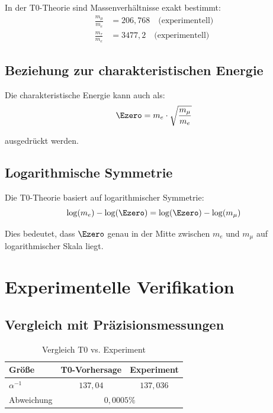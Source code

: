 	In der T0-Theorie sind Massenverhältnisse exakt bestimmt:
	\begin{align}
		\frac{m_\mu}{m_e} &= 206{,}768 \quad \text{(experimentell)} \\
		\frac{m_\tau}{m_e} &= 3477{,}2 \quad \text{(experimentell)}
	\end{align}
	
	\subsection{Beziehung zur charakteristischen Energie}
	
	Die charakteristische Energie kann auch als:
	\begin{equation}
		\Ezero = m_e \cdot \sqrt{\frac{m_\mu}{m_e}}
	\end{equation}
	
	ausgedrückt werden.
	
	\subsection{Logarithmische Symmetrie}
	
	Die T0-Theorie basiert auf logarithmischer Symmetrie:
	\begin{equation}
		\log(m_e) - \log(\Ezero) = \log(\Ezero) - \log(m_\mu)
	\end{equation}
	
	Dies bedeutet, dass $\Ezero$ genau in der Mitte zwischen $m_e$ und $m_\mu$ auf logarithmischer Skala liegt.
	
	\section{Experimentelle Verifikation}
	
	\subsection{Vergleich mit Präzisionsmessungen}
	
	\begin{table}[h]
		\centering
		\begin{tabular}{lcc}
			\hline
			\textbf{Größe} & \textbf{T0-Vorhersage} & \textbf{Experiment} \\
			\hline
			$\alpha^{-1}$ & $137{,}04$ & $137{,}036$ \\
			Abweichung & \multicolumn{2}{c}{$0{,}0005\%$} \\
			\hline
		\end{tabular}
		\caption{Vergleich T0 vs. Experiment}
	\end{table}
	
